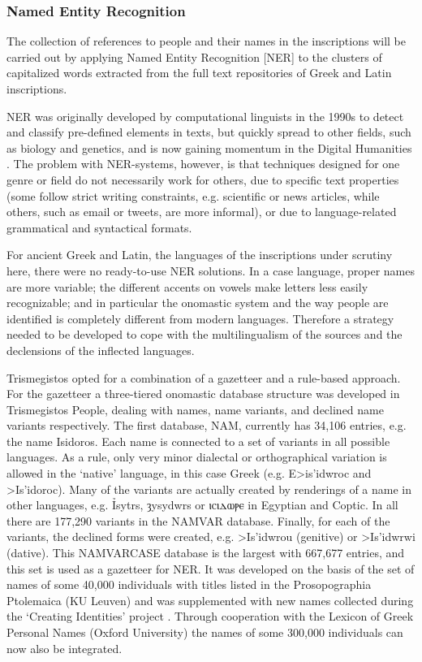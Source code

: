 \documentclass[amsthm,ebook]{saparticle}
\begin{document}
\subsubsection{Named Entity Recognition}


The collection of references to people and their names in the inscriptions will be carried out by applying Named Entity
Recognition [NER] to the clusters of capitalized words extracted from the full text repositories of Greek and Latin
inscriptions.

NER was originally developed by computational linguists in the 1990s to detect and classify pre-defined elements in
texts, but quickly spread to other fields, such as biology and genetics, and is now gaining momentum in the Digital
Humanities \citep{vanHooland}. The problem with NER-systems, however, is that techniques designed for one
genre or field do not necessarily work for others, due to specific text properties (some follow strict writing
constraints, e.g. scientific or news articles, while others, such as email or tweets, are more informal), or due to
language-related grammatical and syntactical formats.

For ancient Greek and Latin, the languages of the inscriptions under scrutiny here, there were no ready-to-use NER
solutions. In a case language, proper names are more variable; the different accents on vowels make letters less easily
recognizable; and in particular the onomastic system and the way people are identified is completely different from
modern languages. Therefore a strategy needed to be developed to cope with the multilingualism of the sources and the
declensions of the inflected languages. 

Trismegistos opted for a combination of a gazetteer and a rule-based approach. For the gazetteer a three-tiered
onomastic database structure was developed in Trismegistos People, dealing with names, name variants, and declined name
variants respectively. The first database, NAM, currently has 34,106 entries, e.g. the name Isidoros. Each name is
connected to a set of variants in all possible languages. As a rule, only very minor dialectal or orthographical
variation is allowed in the `native' language, in this case Greek (e.g. \textgreek{E>is'idwroc }and
\textgreek{>Is'idoroc). }Many of the variants are actually created by renderings of a name in other languages, e.g.
Ỉsytrs, ȝysydwrs or ⲓⲥⲓⲇⲱⲣⲉ in Egyptian and Coptic. In all there
are 177,290 variants in the NAMVAR database. Finally, for each of the variants, the declined forms were created, e.g.
\textgreek{>Is'idwrou (}genitive) or \textgreek{>Is'idwrwi (}dative). This NAMVARCASE database is the largest with
667,677 entries, and this set is used as a gazetteer for NER. It was developed on the basis of the set of names of some
40,000 individuals with titles listed in the Prosopographia Ptolemaica (KU Leuven) and was supplemented with new names
collected during the `Creating Identities' project \citep{Depauw2009}. Through cooperation with the Lexicon of
Greek Personal Names (Oxford University) the names of some 300,000 individuals can now also be integrated.
\end{document}
